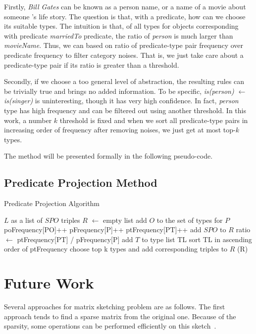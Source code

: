 \documentclass{acm_proc_article-sp}
\begin{document}
Firstly, \textit{Bill Gates} can be known as a person name, or a name of a movie about someone 's life story. The question is that, with a predicate, how can we choose its suitable types. The intuition is that, of all types for objects corresponding with predicate \textit{marriedTo} predicate, the ratio of \textit{person} is much larger than \textit{movieName}. Thus, we can based on ratio of predicate-type pair frequency over predicate frequency to filter category noises. That is, we just take care about a predicate-type pair if its ratio is greater than a threshold.

Secondly, if we choose a too general level of abstraction, the resulting rules can be trivially true and brings no added information. To be specific, \textit{is(person) $\leftarrow$ is(singer)} is uninteresting, though it has very high confidence. In fact, \textit{person} type has high frequency and can be filtered out using another threshold. In this work, a number $k$ threshold is fixed and when we sort all predicate-type pairs in increasing order of frequency after removing noises, we just get at most top-$k$ types.

The method will be presented formally in the following pseudo-code.

\subsection{Predicate Projection Method}

\begin{algorithm}
\caption{Predicate Projection Algorithm}
\label{algo1}
\begin{algorithmic}
\REQUIRE $L$ as a list of $SPO$ triples
\STATE $R$ $\leftarrow$ empty list
\STATE add $O$ to the set of types for $P$
\ENDIF
\STATE poFrequency[PO]++
\STATE pFrequency[P]++
\ENDFOR
{}
\STATE ptFrequency[PT]++
\ENDFOR
\ENDFOR
{}
\STATE add $SPO$ to $R$
\ENDIF
{}
\STATE ratio $\leftarrow$ ptFrequency[PT] / pFrequency[P]
\STATE add $T$ to type list TL
\ENDIF
\STATE sort TL in ascending order of ptFrequency
\STATE choose top k types and add corresponding triples to $R$
\ENDFOR
\ENDFOR
\RETURN(R)
\end{algorithmic}
\end{algorithm}

\section{Future Work}

Several approaches for matrix sketching problem are as follows. The first approach tends to find a sparse matrix from the original one. Because of the sparsity, some operations can be performed efficiently on this sketch~\cite{ref1}.




\end{document}
